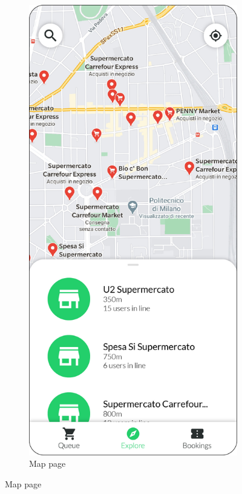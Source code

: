 \begin{figure}[H]
    \centering
    \begin{subfigure}[t]{0.28\textwidth} 
        \includegraphics{../mockups/map}
        \caption*{Map page}

\end{subfigure}
\end{figure}
